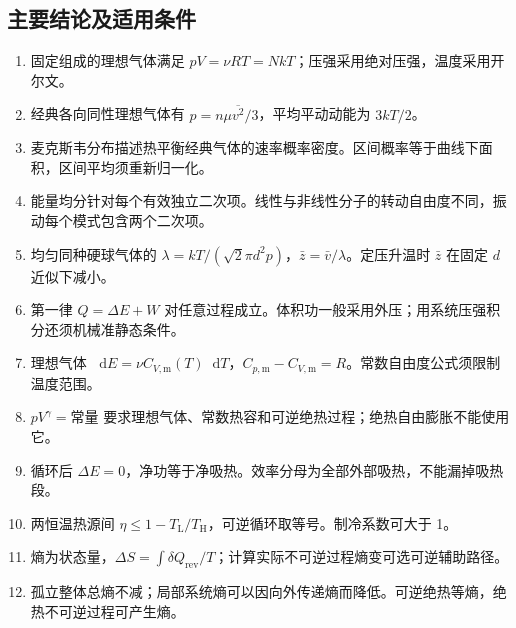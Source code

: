 \documentclass[UTF8,fontset=none,zihao=-4,a4paper]{ctexart}
\newcommand{\dd}{\mathop{}\!\mathrm{d}}
\begin{document}
\subsection{主要结论及适用条件}
\begin{enumerate}
\item 固定组成的理想气体满足 $pV=\nu RT=NkT$；压强采用绝对压强，温度采用开尔文。
\item 经典各向同性理想气体有 $p=n\mu\overline{v^2}/3$，平均平动动能为 $3kT/2$。
\item 麦克斯韦分布描述热平衡经典气体的速率概率密度。区间概率等于曲线下面积，区间平均须重新归一化。
\item 能量均分针对每个有效独立二次项。线性与非线性分子的转动自由度不同，振动每个模式包含两个二次项。
\item 均匀同种硬球气体的 $\lambda=kT/(\sqrt2\pi d^2p)$，$\bar z=\bar v/\lambda$。定压升温时 $\bar z$ 在固定 $d$ 近似下减小。
\item 第一律 $Q=\Delta E+W$ 对任意过程成立。体积功一般采用外压；用系统压强积分还须机械准静态条件。
\item 理想气体 $\dd E=\nu C_{V,\mathrm m}(T)\dd T$，$C_{p,\mathrm m}-C_{V,\mathrm m}=R$。常数自由度公式须限制温度范围。
\item $pV^\gamma=\text{常量}$ 要求理想气体、常数热容和可逆绝热过程；绝热自由膨胀不能使用它。
\item 循环后 $\Delta E=0$，净功等于净吸热。效率分母为全部外部吸热，不能漏掉吸热段。
\item 两恒温热源间 $\eta\le1-T_{\mathrm L}/T_{\mathrm H}$，可逆循环取等号。制冷系数可大于 1。
\item 熵为状态量，$\Delta S=\int\delta Q_{\mathrm{rev}}/T$；计算实际不可逆过程熵变可选可逆辅助路径。
\item 孤立整体总熵不减；局部系统熵可以因向外传递熵而降低。可逆绝热等熵，绝热不可逆过程可产生熵。
\end{enumerate}
\end{document}
